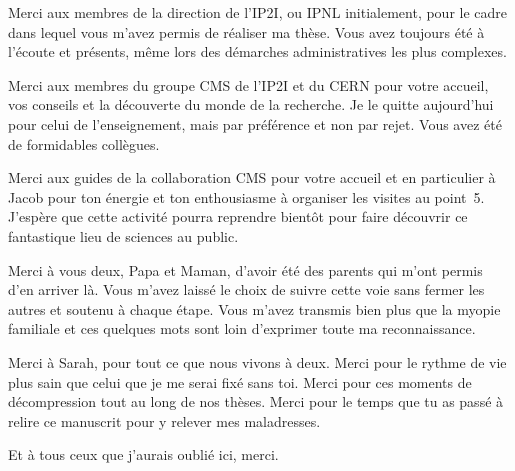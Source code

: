 \par
Merci aux membres de la direction de l'IP2I, ou IPNL initialement,
pour le cadre dans lequel vous m'avez permis de réaliser ma thèse.
Vous avez toujours été à l'écoute et présents, même lors des démarches administratives les plus complexes.
\par
Merci aux membres du groupe CMS de l'IP2I et du CERN
pour votre accueil, vos conseils et la découverte du monde de la recherche.
Je le quitte aujourd'hui pour celui de l'enseignement,
mais par préférence et non par rejet.
Vous avez été de formidables collègues.
\par
Merci aux guides de la collaboration CMS pour votre accueil
et en particulier à Jacob pour ton énergie et ton enthousiasme
à organiser les visites au point~5.
J'espère que cette activité pourra reprendre bientôt
pour faire découvrir ce fantastique lieu de sciences
au public.
\par
Merci à vous deux, Papa et Maman,
d'avoir été des parents qui m'ont permis d'en arriver là.
Vous m'avez laissé le choix de suivre cette voie sans fermer les autres
et
soutenu à chaque étape.
Vous m'avez transmis bien plus que la myopie familiale
et ces quelques mots sont loin d'exprimer toute ma reconnaissance.
\par
Merci à Sarah,
pour tout ce que nous vivons à deux.
Merci pour le rythme de vie plus sain que celui que je me serai fixé sans toi.
Merci pour ces moments de décompression tout au long de nos thèses.
Merci pour le temps que tu as passé à relire ce manuscrit pour y relever mes maladresses.
\par
Et à tous ceux que j'aurais oublié ici,
merci.